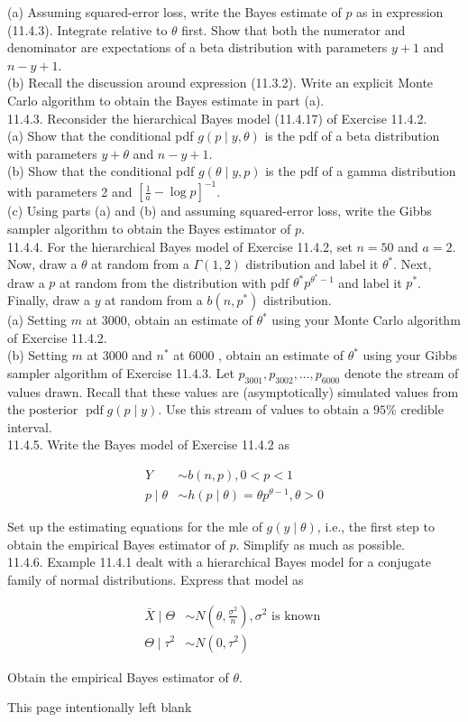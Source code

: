 (a) Assuming squared-error loss, write the Bayes estimate of $p$ as in expression (11.4.3). Integrate relative to $\theta$ first. Show that both the numerator and denominator are expectations of a beta distribution with parameters $y+1$ and $n-y+1$.\\
(b) Recall the discussion around expression (11.3.2). Write an explicit Monte Carlo algorithm to obtain the Bayes estimate in part (a).\\
11.4.3. Reconsider the hierarchical Bayes model (11.4.17) of Exercise 11.4.2.\\
(a) Show that the conditional pdf $g(p \mid y, \theta)$ is the pdf of a beta distribution with parameters $y+\theta$ and $n-y+1$.\\
(b) Show that the conditional pdf $g(\theta \mid y, p)$ is the pdf of a gamma distribution with parameters 2 and $\left[\frac{1}{a}-\log p\right]^{-1}$.\\
(c) Using parts (a) and (b) and assuming squared-error loss, write the Gibbs sampler algorithm to obtain the Bayes estimator of $p$.\\
11.4.4. For the hierarchical Bayes model of Exercise 11.4.2, set $n=50$ and $a=2$. Now, draw a $\theta$ at random from a $\Gamma(1,2)$ distribution and label it $\theta^{*}$. Next, draw a $p$ at random from the distribution with pdf $\theta^{*} p^{\theta^{*}-1}$ and label it $p^{*}$. Finally, draw a $y$ at random from a $b\left(n, p^{*}\right)$ distribution.\\
(a) Setting $m$ at 3000, obtain an estimate of $\theta^{*}$ using your Monte Carlo algorithm of Exercise 11.4.2.\\
(b) Setting $m$ at 3000 and $n^{*}$ at 6000 , obtain an estimate of $\theta^{*}$ using your Gibbs sampler algorithm of Exercise 11.4.3. Let $p_{3001}, p_{3002}, \ldots, p_{6000}$ denote the stream of values drawn. Recall that these values are (asymptotically) simulated values from the posterior $\operatorname{pdf} g(p \mid y)$. Use this stream of values to obtain a $95 \%$ credible interval.\\
11.4.5. Write the Bayes model of Exercise 11.4.2 as

$$
\begin{aligned}
Y & \sim b(n, p), 0<p<1 \\
p \mid \theta & \sim h(p \mid \theta)=\theta p^{\theta-1}, \theta>0
\end{aligned}
$$

Set up the estimating equations for the mle of $g(y \mid \theta)$, i.e., the first step to obtain the empirical Bayes estimator of $p$. Simplify as much as possible.\\
11.4.6. Example 11.4.1 dealt with a hierarchical Bayes model for a conjugate family of normal distributions. Express that model as

$$
\begin{aligned}
\bar{X} \mid \Theta & \sim N\left(\theta, \frac{\sigma^{2}}{n}\right), \sigma^{2} \text { is known } \\
\Theta \mid \tau^{2} & \sim N\left(0, \tau^{2}\right)
\end{aligned}
$$

Obtain the empirical Bayes estimator of $\theta$.

This page intentionally left blank

